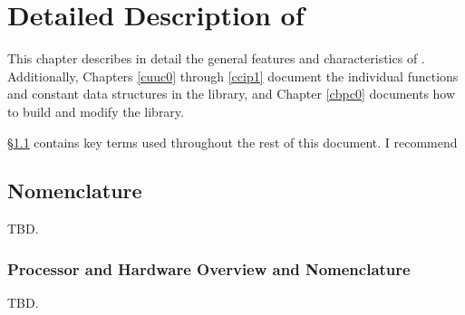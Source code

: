 \chapter{Detailed Description of \emph{\productbasenameshort{}}}
\label{cldd0}

This chapter describes in detail the general features and characteristics
of \emph{\productbasenameshort{}}\@.  Additionally, Chapters \ref{cuuc0}
through \ref{ccip1} document the individual functions and constant data
structures in the library, and Chapter \ref{cbpc0} documents how to build
and modify the library.

\S{}\ref{cldd0:snom0} contains key terms used throughout the rest of this
document.  I recommend 


\section{Nomenclature}
\label{cldd0:snom0}

TBD.




\subsection{Processor and Hardware Overview and Nomenclature}
\label{cldd0:snom0:spnc0}

TBD.

